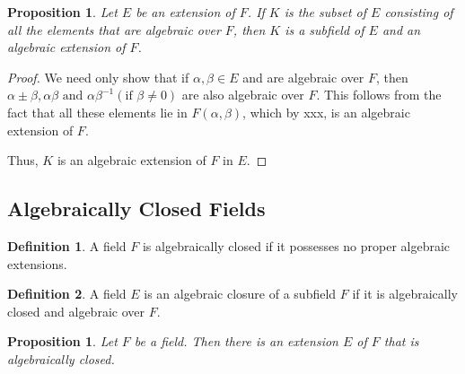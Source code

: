 \documentclass[draft]{article}
\newtheorem{prop}[thm]{Proposition}
\theoremstyle{definition}
\newtheorem{defn}{Definition}[section]
\theoremstyle{remark}
\begin{document}
            \begin{prop}
                Let $E$ be an extension of $F$. If $K$ is the subset of $E$ consisting of all the elements that are algebraic over $F$, then $K$ is a subfield of $E$ and an algebraic extension of $F$.
            \end{prop}
            
            \begin{proof}
                We need only show that if $\alpha, \beta \in E$ and are algebraic over $F$, then $\alpha \pm \beta, \alpha\beta \text{ and } \alpha\beta^{-1} (\text{if } \beta \neq 0)$ are also algebraic over $F$. This follows from the fact that all these elements lie in $F(\alpha, \beta)$, which by xxx, is an algebraic extension of $F$.\par
                Thus, $K$ is an algebraic extension of $F$ in $E$.
            \end{proof}
            
        \subsection{Algebraically Closed Fields}
        
            \begin{defn}
                A field $F$ is algebraically closed if it possesses no proper algebraic extensions.
            \end{defn}
            
            \begin{defn}
                A field $E$ is an algebraic closure of a subfield $F$ if it is algebraically closed and algebraic over $F$.
            \end{defn}
            
            \begin{prop}
                Let $F$ be a field. Then there is an extension $E$ of $F$ that is algebraically closed.
            \end{prop}
            
\end{document}
